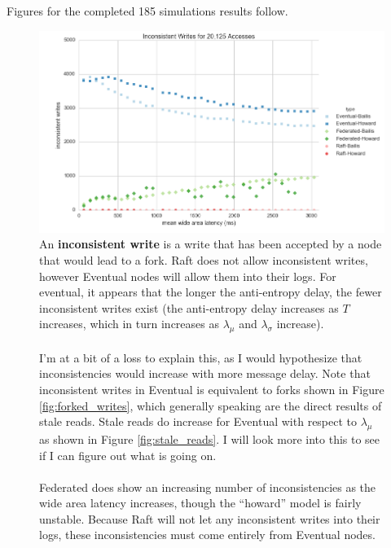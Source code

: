 \documentclass[11pt,letterpaper]{article}
\begin{document}
Figures for the completed 185 simulations results follow.

\begin{figure}[!h]
    \centering
        \includegraphics[width=\textwidth]{figures/inconsistent_writes.png}
        \caption{\textsf{An \textbf{inconsistent write} is a write that has been accepted by a node that would lead to a fork. Raft does not allow inconsistent writes, however Eventual nodes will allow them into their logs. For eventual, it appears that the longer the anti-entropy delay, the fewer inconsistent writes exist (the anti-entropy delay increases as $T$ increases, which in turn increases as $\lambda_{\mu}$ and $\lambda_{\sigma}$ increase). \\
\\
        I'm at a bit of a loss to explain this, as I would hypothesize that inconsistencies would increase with more message delay. Note that inconsistent writes in Eventual is equivalent to forks shown in Figure \ref{fig:forked_writes}, which generally speaking are the direct results of stale reads. Stale reads do increase for Eventual with respect to $\lambda_{\mu}$ as shown in Figure \ref{fig:stale_reads}. I will look more into this to see if I can figure out what is going on.\\
\\
        Federated does show an increasing number of inconsistencies as the wide area latency increases, though the ``howard'' model is fairly unstable. Because Raft will not let any inconsistent writes into their logs, these inconsistencies must come entirely from Eventual nodes.}}
        \label{fig:inconsistent_writes}
\end{figure}
\end{document}
